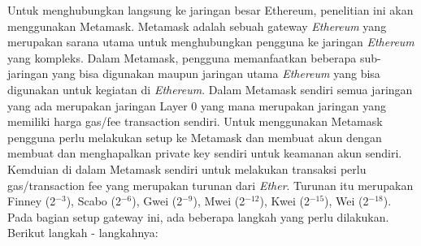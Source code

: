 Untuk menghubungkan langsung ke jaringan besar Ethereum, penelitian ini akan menggunakan Metamask. Metamask adalah sebuah gateway \emph{Ethereum} yang merupakan sarana utama untuk menghubungkan pengguna ke jaringan \emph{Ethereum} yang kompleks. Dalam Metamask, pengguna memanfaatkan beberapa sub-jaringan yang bisa digunakan maupun jaringan utama \emph{Ethereum} yang bisa digunakan untuk kegiatan di \emph{Ethereum}. Dalam Metamask sendiri semua jaringan yang ada merupakan jaringan Layer 0 yang mana merupakan jaringan yang memiliki harga gas/fee transaction sendiri. Untuk menggunakan Metamask pengguna perlu melakukan setup ke Metamask dan membuat akun dengan membuat dan menghapalkan private key sendiri untuk keamanan akun sendiri. Kemduian di dalam Metamask sendiri untuk melakukan transaksi perlu gas/transaction fee yang merupakan turunan dari \emph{Ether}. Turunan itu merupakan Finney (2$^{-3}$), Scabo (2$^{-6}$), Gwei (2$^{-9}$), Mwei (2$^{-12}$), Kwei (2$^{-15}$), Wei (2$^{-18}$).
\\
\newpage
Pada bagian setup gateway ini, ada beberapa langkah yang perlu dilakukan. Berikut langkah - langkahnya:
